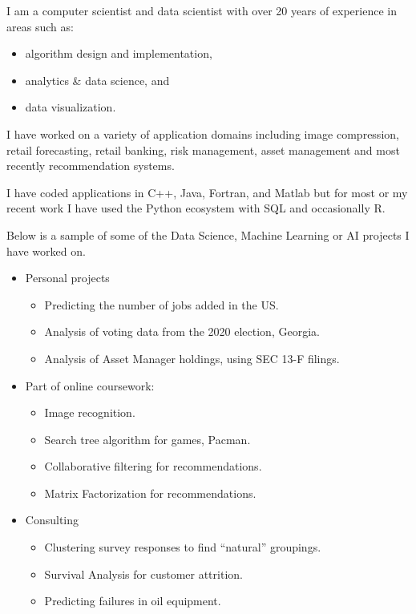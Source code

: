 \documentclass{article}
\begin{document}
\noindent
I am a computer scientist and data scientist with over 20 years of experience in areas such as:
\begin{itemize}[noitemsep]
 \item algorithm design and implementation,
 \item analytics \& data science, and
 \item data visualization.
\end{itemize}

I have worked on a variety of application domains including image compression, retail forecasting, retail banking, risk management, asset management and most recently recommendation systems.

I have coded applications in C++, Java, Fortran, and Matlab but for most or my recent work I have used the Python ecosystem with SQL and occasionally R.
\vspace{0.1in}

Below is a sample of some of the Data Science, Machine Learning or AI projects I have worked on.
\begin{itemize}[noitemsep]
\itemsep0em
\item Personal projects
    \begin{itemize}
  \item  Predicting the number of jobs added in the US.
  \item Analysis of voting data from the 2020 election, Georgia.
     \item Analysis of Asset Manager holdings, using SEC 13-F filings.
 \end{itemize}
 \item Part of online coursework:
    \begin{itemize}
       \item  Image recognition.
       \item Search tree algorithm for games, Pacman.
       \item Collaborative filtering for recommendations.
       \item Matrix Factorization for recommendations.
\end{itemize}        
\item  Consulting
 \begin{itemize}
     \item Clustering survey responses to find “natural” groupings.
     \item Survival Analysis for customer attrition.
      \item Predicting failures in oil equipment.    
  \end{itemize}       
\end{itemize}
\end{document}
